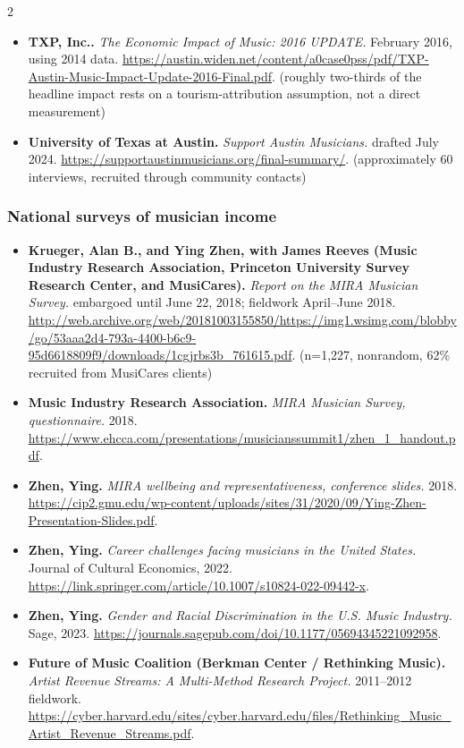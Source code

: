 {\begin{multicols}{2}
\begin{itemize}[itemsep=0pt,topsep=1pt,parsep=0pt,partopsep=0pt,leftmargin=1em]
\item \textbf{TXP, Inc..} \textit{The Economic Impact of Music: 2016 UPDATE.} February 2016, using 2014 data. \url{https://austin.widen.net/content/a0case0pss/pdf/TXP-Austin-Music-Impact-Update-2016-Final.pdf}. {\color{ammuted}(roughly two-thirds of the headline impact rests on a tourism-attribution assumption, not a direct measurement)}
\item \textbf{University of Texas at Austin.} \textit{Support Austin Musicians.} drafted July 2024. \url{https://supportaustinmusicians.org/final-summary/}. {\color{ammuted}(approximately 60 interviews, recruited through community contacts)}
\end{itemize}
\subsubsection*{National surveys of musician income}
\begin{itemize}[itemsep=0pt,topsep=1pt,parsep=0pt,partopsep=0pt,leftmargin=1em]
\item \textbf{Krueger, Alan B., and Ying Zhen, with James Reeves (Music Industry Research Association, Princeton University Survey Research Center, and MusiCares).} \textit{Report on the MIRA Musician Survey.} embargoed until June 22, 2018; fieldwork April--June 2018. \url{http://web.archive.org/web/20181003155850/https://img1.wsimg.com/blobby/go/53aaa2d4-793a-4400-b6c9-95d6618809f9/downloads/1cgjrbs3b_761615.pdf}. {\color{ammuted}(n=1,227, nonrandom, 62\% recruited from MusiCares clients)}
\item \textbf{Music Industry Research Association.} \textit{MIRA Musician Survey, questionnaire.} 2018. \url{https://www.ehcca.com/presentations/musicianssummit1/zhen_1_handout.pdf}.
\item \textbf{Zhen, Ying.} \textit{MIRA wellbeing and representativeness, conference slides.} 2018. \url{https://cip2.gmu.edu/wp-content/uploads/sites/31/2020/09/Ying-Zhen-Presentation-Slides.pdf}.
\item \textbf{Zhen, Ying.} \textit{Career challenges facing musicians in the United States.} Journal of Cultural Economics, 2022. \url{https://link.springer.com/article/10.1007/s10824-022-09442-x}.
\item \textbf{Zhen, Ying.} \textit{Gender and Racial Discrimination in the U.S. Music Industry.} Sage, 2023. \url{https://journals.sagepub.com/doi/10.1177/05694345221092958}.
\item \textbf{Future of Music Coalition (Berkman Center / Rethinking Music).} \textit{Artist Revenue Streams: A Multi-Method Research Project.} 2011--2012 fieldwork. \url{https://cyber.harvard.edu/sites/cyber.harvard.edu/files/Rethinking_Music_Artist_Revenue_Streams.pdf}.

\end{itemize}
\end{multicols}}
